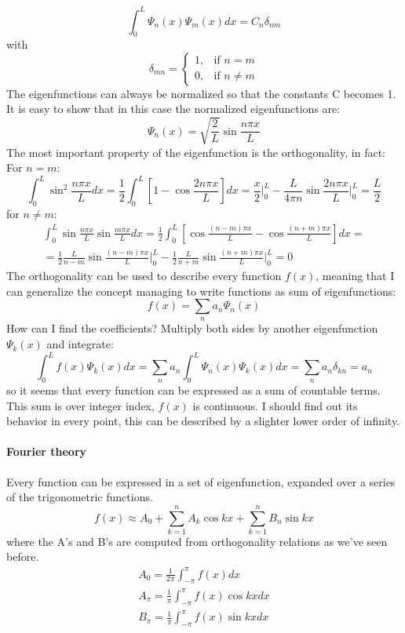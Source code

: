 \begin{equation}
    \int_0^L\Psi_n(x)\Psi_m(x)dx=C_n\delta_{nm}
\end{equation}
with $$\delta_{mn}=\begin{cases}
    1 , &\text{if $n=m$}\\
    0, &\text{if $n\ne m$}
\end{cases}$$
The eigenfunctions can always be normalized so that the constants C becomes 1. It is easy to show that in this case the normalized eigenfunctions are:
\begin{equation}
    \Psi_n(x)=\sqrt{\frac{2}{L}}\sin\frac{n\pi x}{L}
\end{equation}
The most important property of the eigenfunction is the
orthogonality, in fact:
For $n=m$: 
$$\int_0^L\sin^2\frac{n\pi x}{L}dx=\frac{1}{2}\int_0^L\left[1-\cos\frac{2n\pi x}{L}\right]dx=\frac{x}{2}\bigg|_0^L-\frac{L}{4\pi n}\sin\frac{2n\pi x}{L}\bigg|_0^L=\frac{L}{2}$$
for $n\ne m$:
\begin{equation*}
    \begin{split}
     \int_0^L\sin\frac{n\pi x}{L}\sin\frac{m\pi x}{L}dx=\frac{1}{2}\int_0^L\left[\cos\frac{(n-m)\pi x}{L}-\cos\frac{(n+m)\pi x}{L}\right]dx= \\
     =\frac{1}{2}\frac{L}{n-m}\sin\frac{(n-m)\pi x}{L}\bigg|_0^L-\frac{1}{2}\frac{L}{n+m}\sin\frac{(n+m)\pi x}{L}\bigg|_0^L=0
    \end{split}
\end{equation*}
The orthogonality can be used to describe every function $f(x)$, meaning that I can generalize the concept managing to write functions as sum of eigenfunctions:
$$f(x)=\displaystyle\sum_na_n\Psi_n(x)$$
How can I find the coefficients? Multiply both sides by another
eigenfunction $\Psi_k(x)$ and integrate:
$$\int_0^Lf(x)\Psi_k(x)dx=\displaystyle\sum_na_n\int_0^L\Psi_n(x)\Psi_k(x)dx=\displaystyle\sum_na_n\delta_{kn}=a_n$$
so it seems that every function can be expressed as a sum of countable terms. This sum is over integer index, $f(x)$ is continuous. I should find out its behavior in every point, this can be described by a slighter lower order of infinity. 
\paragraph{Fourier theory} Every function can be expressed in a set of eigenfunction, expanded over a series of the trigonometric functions. 
\begin{equation}
    f(x)\approx A_0+\displaystyle\sum_{k=1}^nA_k\cos kx+\sum_{k=1}^nB_n\sin kx
\end{equation}
where the A's and B's are computed from orthogonality relations as we've seen before.
\begin{align*}
    A_0=\frac{1}{2\pi}\int_{-\pi}^{\pi}f(x)dx\\
    A_{\pi}=\frac{1}{\pi}\int_{-\pi}^{\pi}f(x)\cos kxdx \\
    B_{\pi}=\frac{1}{\pi}\int_{-\pi}^{\pi} f(x)\sin kx dx 
\end{align*}

